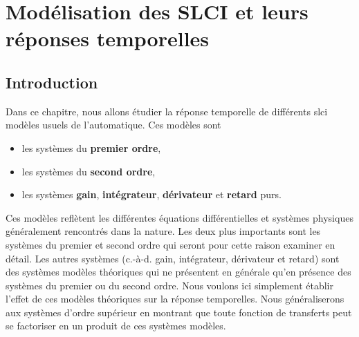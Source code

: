 \chapter[Modélisation des SLCI]
        {Modélisation des SLCI\label{chap-model} et leurs réponses temporelles}
\minitoc
\newpage
\section{Introduction}
Dans ce chapitre, nous allons étudier la réponse 
temporelle de différents \gls{slci} modèles usuels de l'automatique. 
Ces modèles sont 
\begin{itemize}
    \item les systèmes du \textbf{premier ordre},
    \item les systèmes du \textbf{second ordre},
    \item les systèmes \textbf{gain}, \textbf{intégrateur}, \textbf{dérivateur} 
          et \textbf{retard} purs.
\end{itemize}
Ces modèles reflètent les différentes équations différentielles et 
systèmes physiques généralement rencontrés dans la nature.
Les deux plus importants sont les systèmes du premier et second ordre 
qui seront pour cette raison examiner en détail. 
Les autres systèmes (c.-à-d. gain, intégrateur, dérivateur et retard) 
sont des systèmes modèles théoriques qui ne présentent en générale qu'en 
présence des systèmes du premier ou du second ordre. Nous voulons ici simplement
établir l'effet de ces modèles théoriques sur la réponse temporelles.
Nous généraliserons aux systèmes d'ordre supérieur en montrant 
que toute fonction de transferts peut se factoriser en un produit
de ces systèmes modèles.

